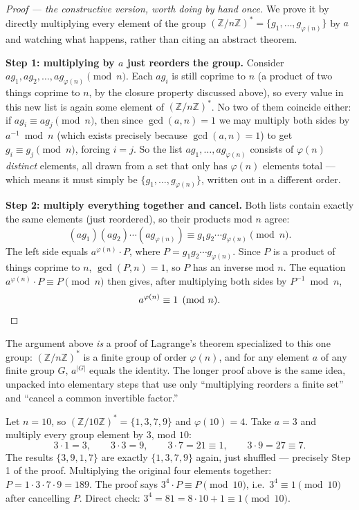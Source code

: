 \begin{proof}[Proof --- the constructive version, worth doing by hand once]
We prove it by directly multiplying every element of the group $(\mathbb{Z}/n\mathbb{Z})^{*} = \{g_1,\dots,g_{\varphi(n)}\}$ by $a$ and watching what happens, rather than citing an abstract theorem.

\textbf{Step 1: multiplying by $a$ just reorders the group.} Consider $ag_1, ag_2, \dots, ag_{\varphi(n)} \pmod n$. Each $ag_i$ is still coprime to $n$ (a product of two things coprime to $n$, by the closure property discussed above), so every value in this new list is again some element of $(\mathbb{Z}/n\mathbb{Z})^{*}$. No two of them coincide either: if $ag_i \equiv ag_j \pmod n$, then since $\gcd(a,n)=1$ we may multiply both sides by $a^{-1}\bmod n$ (which exists precisely because $\gcd(a,n)=1$) to get $g_i \equiv g_j \pmod n$, forcing $i=j$. So the list $ag_1,\dots,ag_{\varphi(n)}$ consists of $\varphi(n)$ \emph{distinct} elements, all drawn from a set that only has $\varphi(n)$ elements total — which means it must simply be $\{g_1,\dots,g_{\varphi(n)}\}$, written out in a different order.

\textbf{Step 2: multiply everything together and cancel.} Both lists contain exactly the same elements (just reordered), so their products mod $n$ agree:
\[
(ag_1)(ag_2)\cdots(ag_{\varphi(n)}) \equiv g_1g_2\cdots g_{\varphi(n)} \pmod n.
\]
The left side equals $a^{\varphi(n)}\cdot P$, where $P=g_1g_2\cdots g_{\varphi(n)}$. Since $P$ is a product of things coprime to $n$, $\gcd(P,n)=1$, so $P$ has an inverse mod $n$. The equation $a^{\varphi(n)}\cdot P \equiv P \pmod n$ then gives, after multiplying both sides by $P^{-1}\bmod n$,
\[
a^{\varphi(n)} \equiv 1 \pmod n. \qedhere
\]
\end{proof}

\begin{remark}
The argument above \emph{is} a proof of Lagrange's theorem specialized to this one group: $(\mathbb{Z}/n\mathbb{Z})^{*}$ is a finite group of order $\varphi(n)$, and for any element $a$ of any finite group $G$, $a^{|G|}$ equals the identity. The longer proof above is the same idea, unpacked into elementary steps that use only ``multiplying reorders a finite set'' and ``cancel a common invertible factor.''
\end{remark}

\begin{example}
Let $n=10$, so $(\mathbb{Z}/10\mathbb{Z})^{*}=\{1,3,7,9\}$ and $\varphi(10)=4$. Take $a=3$ and multiply every group element by $3$, mod $10$:
\[
3\cdot1=3, \qquad 3\cdot3=9, \qquad 3\cdot7=21\equiv1, \qquad 3\cdot9=27\equiv7.
\]
The results $\{3,9,1,7\}$ are exactly $\{1,3,7,9\}$ again, just shuffled — precisely Step 1 of the proof. Multiplying the original four elements together: $P=1\cdot3\cdot7\cdot9=189$. The proof says $3^4\cdot P\equiv P\pmod{10}$, i.e.\ $3^4\equiv1\pmod{10}$ after cancelling $P$. Direct check: $3^4=81=8\cdot10+1\equiv1\pmod{10}$. \checkmark
\end{example}

